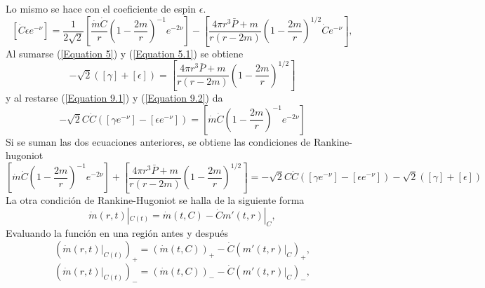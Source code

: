 \documentclass{article}
\begin{document}
     Lo mismo se hace con el coeficiente de espin $\epsilon$.
     \begin{equation}
        \left[ \dot{C}\epsilon e^{-\nu}\right]= \dfrac{1}{2\sqrt{2}}\left[  \dfrac{\dot{m} \dot{C}}{r}\left( 1-\dfrac{2m}{r}\right)^{-1} e^{-2\nu} \right] - \left[\dfrac{4\pi r^{3}\bar{P}+m}{r \left( r-2m \right)}\left(1-\dfrac{2m}{r} \right)^{1/2} \dot{C}e^{-\nu}\right],
        \label{Equation 9.2}
    \end{equation}
    Al sumarse (\ref{Equation 5}) y (\ref{Equation 5.1}) se obtiene
    \begin{equation}
        -\sqrt{2} \left(\left[ \gamma\right] + \left[ \epsilon \right] \right) = \left[\dfrac{4\pi r^{3}\bar{P}+m}{r \left( r-2m \right)}\left(1-\dfrac{2m}{r} \right)^{1/2}\right]
    \end{equation}
    y al restarse (\ref{Equation 9.1}) y (\ref{Equation 9.2}) da
    \begin{equation}
       - \sqrt{2}C \dot{C}\left( \left[ \gamma e^{-\nu}\right]- \left[ \epsilon e^{-\nu}\right]\right)= \left[  \dot{m}\dot{C}\left( 1-\dfrac{2m}{r}\right)^{-1} e^{-2\nu} \right]
    \end{equation}
    Si se suman las dos ecuaciones anteriores, se obtiene las condiciones de Rankine-hugoniot
    \begin{equation}
        \left[  \dot{m}\dot{C}\left( 1-\dfrac{2m}{r}\right)^{-1} e^{-2\nu} \right] + \left[\dfrac{4\pi r^{3}\bar{P}+m}{r \left( r-2m \right)}\left(1-\dfrac{2m}{r} \right)^{1/2}\right]= -\sqrt{2}C \dot{C}\left( \left[ \gamma e^{-\nu}\right]- \left[ \epsilon e^{-\nu}\right]\right)- \sqrt{2} \left(\left[ \gamma\right] + \left[ \epsilon \right] \right) 
    \end{equation}
    La otra condición de Rankine-Hugoniot se halla de la siguiente forma
    \begin{equation}
        \dot{m}(r,t)|_{C(t)}=\dot{m}(t,C)-\dot{C}m'(t,r)|_{C},
        \label{SecondRankine}
    \end{equation}
    Evaluando la función en una región antes y después
    \begin{equation}
        \left(\dot{m}(r,t)|_{C(t)}\right)_{+}=\left(\dot{m}(t,C)\right)_{+}-\dot{C}\left(m'(t,r)|_{C}\right)_{+},
        \label{Rankinesecond1}
    \end{equation}
    \begin{equation}
        \left(\dot{m}(r,t)|_{C(t)}\right)_{-}=\left(\dot{m}(t,C)\right)_{-}-\dot{C}\left(m'(t,r)|_{C}\right)_{-},
        \label{Rankinesecond2}
    \end{equation}
\end{document}
